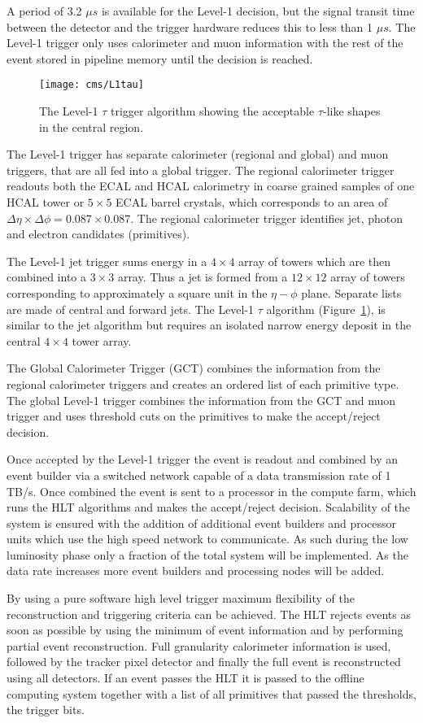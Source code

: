 A period of 3.2 $\mu s$ is available for the Level-1 decision, but the signal transit time between the detector and the trigger hardware reduces this to less than 1 $\mu s$. The Level-1 trigger only uses calorimeter and muon information with the rest of the event stored in pipeline memory until the decision is reached.

\begin{figure}[hbt]
  \centering
  \texttt{[image: cms/L1tau]}
  \caption{The Level-1 $\tau$ trigger algorithm showing the acceptable $\tau$-like shapes in the central region.~\cite{citeulike:903780}
  \label{fig:L1tau}}
\end{figure}

The Level-1 trigger has separate calorimeter (regional and global) and muon triggers, that are all fed into a global trigger. The regional calorimeter trigger readouts both the ECAL and HCAL calorimetry in coarse grained samples of one HCAL tower or $5\times5$ ECAL barrel crystals, which corresponds to an area of $\Delta\eta \times \Delta\phi = 0.087\times0.087$. The regional calorimeter trigger identifies jet, photon and electron candidates (primitives).

The Level-1 jet trigger sums energy in a $4\times4$ array of towers which are then combined into a $3\times3$ array. Thus a jet is formed from a $12\times12$ array of towers corresponding to approximately a square unit in the $\eta-\phi$ plane. Separate lists are made of central and forward jets. The Level-1 $\tau$ algorithm (Figure~\ref{fig:L1tau}), is similar to the jet algorithm but requires an isolated narrow energy deposit in the central $4\times4$ tower array.  

The Global Calorimeter Trigger (GCT) combines the information from the regional calorimeter triggers and creates an \ET ordered list of each primitive type. The global Level-1 trigger combines the information from the GCT and muon trigger and uses threshold cuts on the primitives to make the accept/reject decision. 

Once accepted by the Level-1 trigger the event is readout and combined by an event builder via a switched network capable of a data transmission rate of 1 TB/s. Once combined the event is sent to a processor in the compute farm, which runs the HLT algorithms and makes the accept/reject decision. Scalability of the system is ensured with the addition of additional event builders and processor units which use the high speed network to communicate. As such during the low luminosity phase only a fraction of the total system will be implemented. As the data rate increases more event builders and processing nodes will be added.

By using a pure software high level trigger maximum flexibility of the reconstruction and triggering criteria can be achieved. The HLT rejects events as soon as possible by using the minimum of event information and by performing partial event reconstruction. Full granularity calorimeter information is used, followed by the tracker pixel detector and finally the full event is reconstructed using all detectors. If an event passes the HLT it is passed to the offline computing system together with a list of all primitives that passed the thresholds, the trigger bits.
